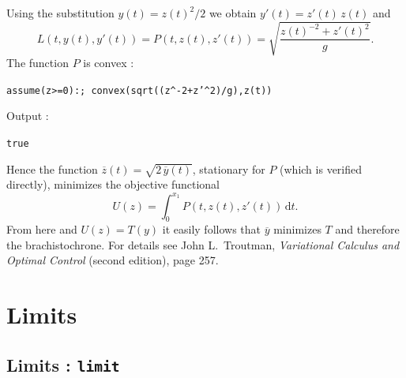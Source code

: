 \documentclass[a4paper,11pt]{book}
\begin{document}
Using the substitution $y(t)=z(t)^2/2$ we obtain $y'(t)=z'(t)\,z(t)$ and
\[ L(t,y(t),y'(t))=P(t,z(t),z'(t))=\sqrt{\frac{z(t)^{-2}+z'(t)^2}{g}}. \]
The function $P$ is convex :
\begin{center}
  \tt assume(z>=0):; convex(sqrt((z\verb|^|-2+z'\verb|^|2)/g),z(t))
\end{center}
Output :
\begin{center}
  \tt true
\end{center}
Hence the function $\overline{z}(t)=\sqrt{2\,\overline{y}(t)}$, stationary for $P$ (which is verified directly), minimizes the objective functional \[U(z)=\int_0^{x_1}P(t,z(t),z'(t))\,\mathrm{d} t.\] From here and $U(z)=T(y)$ it easily follows that $\overline{y}$ minimizes $T$ and therefore the brachistochrone. For details see John L.~Troutman, \emph{Variational Calculus and Optimal Control} (second edition), page 257.

\section{Limits}
\subsection{Limits : {\tt limit}}\label{sec:limit}
\end{document}
